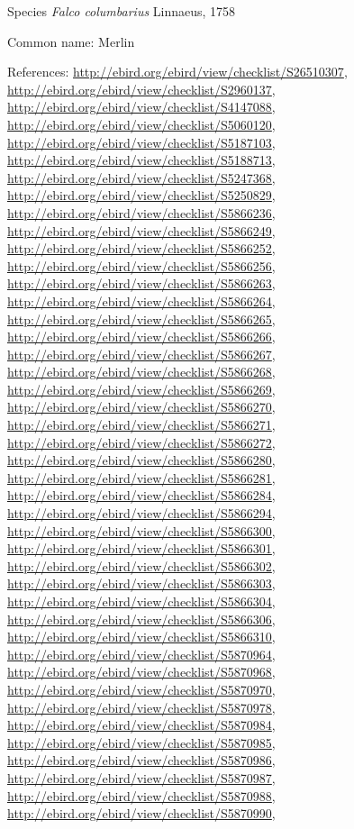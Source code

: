 \documentclass[9pt, article]{memoir}
\begin{document}
\begin{multicols}{2}
\vspace{6pt}\noindent\hspace{36pt}Species \textit{Falco columbarius} Linnaeus, 1758


Common name: Merlin

References: 
\url{http://ebird.org/ebird/view/checklist/S26510307}, 
\url{http://ebird.org/ebird/view/checklist/S2960137}, 
\url{http://ebird.org/ebird/view/checklist/S4147088}, 
\url{http://ebird.org/ebird/view/checklist/S5060120}, 
\url{http://ebird.org/ebird/view/checklist/S5187103}, 
\url{http://ebird.org/ebird/view/checklist/S5188713}, 
\url{http://ebird.org/ebird/view/checklist/S5247368}, 
\url{http://ebird.org/ebird/view/checklist/S5250829}, 
\url{http://ebird.org/ebird/view/checklist/S5866236}, 
\url{http://ebird.org/ebird/view/checklist/S5866249}, 
\url{http://ebird.org/ebird/view/checklist/S5866252}, 
\url{http://ebird.org/ebird/view/checklist/S5866256}, 
\url{http://ebird.org/ebird/view/checklist/S5866263}, 
\url{http://ebird.org/ebird/view/checklist/S5866264}, 
\url{http://ebird.org/ebird/view/checklist/S5866265}, 
\url{http://ebird.org/ebird/view/checklist/S5866266}, 
\url{http://ebird.org/ebird/view/checklist/S5866267}, 
\url{http://ebird.org/ebird/view/checklist/S5866268}, 
\url{http://ebird.org/ebird/view/checklist/S5866269}, 
\url{http://ebird.org/ebird/view/checklist/S5866270}, 
\url{http://ebird.org/ebird/view/checklist/S5866271}, 
\url{http://ebird.org/ebird/view/checklist/S5866272}, 
\url{http://ebird.org/ebird/view/checklist/S5866280}, 
\url{http://ebird.org/ebird/view/checklist/S5866281}, 
\url{http://ebird.org/ebird/view/checklist/S5866284}, 
\url{http://ebird.org/ebird/view/checklist/S5866294}, 
\url{http://ebird.org/ebird/view/checklist/S5866300}, 
\url{http://ebird.org/ebird/view/checklist/S5866301}, 
\url{http://ebird.org/ebird/view/checklist/S5866302}, 
\url{http://ebird.org/ebird/view/checklist/S5866303}, 
\url{http://ebird.org/ebird/view/checklist/S5866304}, 
\url{http://ebird.org/ebird/view/checklist/S5866306}, 
\url{http://ebird.org/ebird/view/checklist/S5866310}, 
\url{http://ebird.org/ebird/view/checklist/S5870964}, 
\url{http://ebird.org/ebird/view/checklist/S5870968}, 
\url{http://ebird.org/ebird/view/checklist/S5870970}, 
\url{http://ebird.org/ebird/view/checklist/S5870978}, 
\url{http://ebird.org/ebird/view/checklist/S5870984}, 
\url{http://ebird.org/ebird/view/checklist/S5870985}, 
\url{http://ebird.org/ebird/view/checklist/S5870986}, 
\url{http://ebird.org/ebird/view/checklist/S5870987}, 
\url{http://ebird.org/ebird/view/checklist/S5870988}, 
\url{http://ebird.org/ebird/view/checklist/S5870990}, 

\end{multicols}
\end{document}
